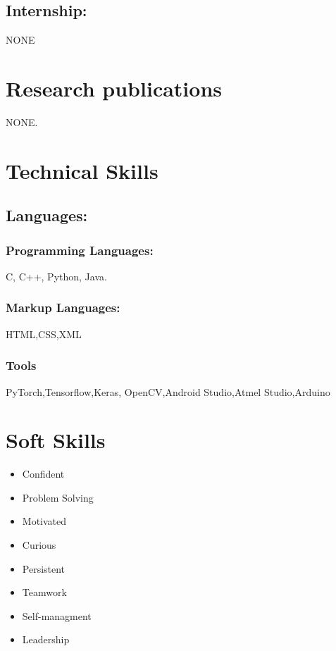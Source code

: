 \documentclass[10pt]{article}
\begin{document}
\subsection{Internship:}
NONE

\section{Research publications}
	NONE.
\section{Technical Skills}
	\subsection{Languages:}
		\subsubsection{Programming Languages: }
			C, C++, Python, Java.
		\subsubsection{Markup Languages:}
			HTML,CSS,XML
		\subsubsection{Tools}
			PyTorch,Tensorflow,Keras, OpenCV,Android Studio,Atmel Studio,Arduino

\section{Soft Skills}
	\begin{multicols}{3}
	\begin{itemize}
	\item Confident \\
 	\item Problem Solving\\
	\item Motivated\\ 
	\columnbreak
	\item Curious\\
	\item Persistent \\
	\item Teamwork\\
	\columnbreak
	\item Self-managment\\
	\item Leadership
	\end{itemize}
	\end{multicols}
\end{document}
